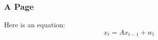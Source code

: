 \documentclass{beamer}
\begin{document}
\begin{frame}[fragile]
\frametitle{A Page}
Here is an equation:
\begin{equation}
x_t = Ax_{t-1} + w_t
\end{equation}
\end{frame}
\end{document}
